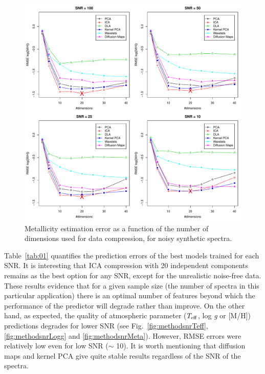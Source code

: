 \documentclass[a4paper,fleqn,usenatbib]{mnras}
\begin{document}
{{{\begin{figure}
\centering\includegraphics[width=\textwidth]{flamesHR10_Meta_log_BestSVM_N-RMSE_test.pdf}
\caption{Metallicity estimation error as a function of the number of
  dimensions used for data compression, for noisy synthetic
  spectra.}
\label{fig:06}
\end{figure}

Table~\ref{tab:01} quantifies the prediction errors of the best models
trained for each SNR. It is interesting that ICA compression with 20
independent components remains as the best option for any SNR, except
for the unrealistic noise-free data. These results evidence that
for a given sample size (the number of spectra in this particular 
application)
there is an optimal number of features beyond which the
performance of the predictor will degrade rather than improve. 
On the other hand, as expected, the quality of atmospheric parameter 
($T_{\rm eff}$, log \textit{g} or [M/H]) predictions 
  degrades for lower SNR (see Fig.~\ref{fig:methodsnrTeff}, 
  \ref{fig:methodsnrLogg} and \ref{fig:methodsnrMeta}). However,
RMSE errors were relatively low even for low SNR ($\sim$ 10).
It is worth mentioning that diffusion maps and kernel PCA give 
quite stable results regardless of the SNR of the spectra.


}}}
\end{document}
